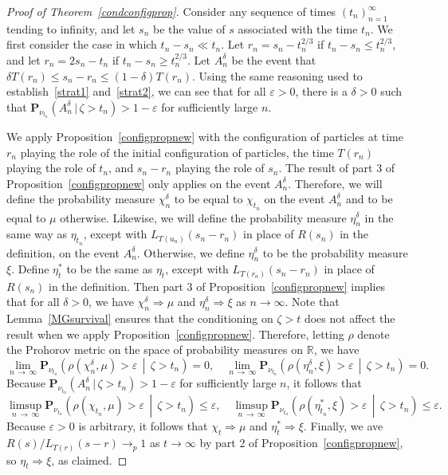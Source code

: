 \documentclass[AHL,Unicode,longabstracts,published]{cedram}
\newcommand*\eps{\varepsilon}
\renewcommand*\P{\mathbf{P}}
\newcommand*\R{\mathbb{R}}
\newcommand{\1} {\mathds{1}}
\begin{document}
\begin{proof}[Proof of Theorem~\ref{condconfigprop}]
Consider any sequence of times $(t_n)_{n=1}^{\infty}$ tending to infinity, and let $s_n$ be the value of $s$ associated with the time $t_n$. We first consider the case in which $t_n - s_n \ll t_n$. Let $r_n = s_n - t_n^{2/3}$ if $t_n - s_n \leq t_n^{2/3}$, and let $r_n = 2s_n - t_n$ if $t_n - s_n \geq t_n^{2/3}$. Let $A_n^{\delta}$ be the event that $\delta T(r_n) \leq s_n - r_n \leq (1 - \delta) T(r_n)$. Using the same reasoning used to establish~\eqref{strat1} and~\eqref{strat2}, we can see that for all $\eps > 0$, there is a $\delta > 0$ such that $\P_{\nu_{t_n}}(A_n^{\delta} \,|\, \zeta > t_n) > 1 - \eps$ for sufficiently large $n$.

We apply Proposition~\ref{configpropnew} with the configuration of particles at time $r_n$ playing the role of the initial configuration of particles, the time $T(r_n)$ playing the role of $t_n$, and $s_n - r_n$ playing the role of $s_n$. The result of part 3 of Proposition~\ref{configpropnew} only applies on the event $A_n^{\delta}$. Therefore, we will define the probability measure $\chi_n^{\delta}$ to be equal to $\chi_{t_n}$ on the event $A_n^{\delta}$ and to be equal to $\mu$ otherwise. Likewise, we will define the probability measure $\eta_n^{\delta}$ in the same way as $\eta_{t_n}$, except with $L_{T(u_n)}(s_n - r_n)$ in place of $R(s_n)$ in the definition, on the event $A_n^{\delta}$. Otherwise, we define $\eta_n^{\delta}$ to be the probability measure $\xi$. Define $\eta_t^*$ to be the same as $\eta_t$, except with $L_{T(r_n)}(s_n - r_n)$ in place of $R(s_n)$ in the definition. Then part 3 of Proposition~\ref{configpropnew} implies that for all $\delta > 0$, we have $\chi_n^{\delta} \Rightarrow \mu$ and $\eta_n^{\delta} \Rightarrow \xi$ as $n \rightarrow \infty$. Note that Lemma~\ref{MGsurvival} ensures that the conditioning on $\zeta > t$ does not affect the result when we apply Proposition~\ref{configpropnew}.
Therefore, letting $\rho$ denote the Prohorov metric on the space of probability measures on $\R$, we have
\[
\lim_{n\,\rightarrow\,\infty} \P_{\nu_{t_n}}\left(\rho\left(\chi_n^{\delta}, \mu\right) > \eps\,\middle|\,\zeta > t_n\right) = 0, \quad\lim_{n\,\rightarrow\,\infty} \P_{\nu_{t_n}}\left(\rho\left(\eta_n^{\delta}, \xi\right) > \eps\,\middle|\,\zeta > t_n\right) = 0.
\]
Because $\P_{\nu_{t_n}}(A_n^{\delta} \,|\, \zeta > t_n) > 1 - \eps$ for sufficiently large $n$, it follows that
\[
\limsup_{n\,\rightarrow\,\infty} \P_{\nu_{t_n}}\left(\rho\left(\chi_{t_n}, \mu\right) > \eps\,\middle|\, \zeta > t_n\right) \leq \eps, \quad\limsup_{n\,\rightarrow\,\infty} \P_{\nu_{t_n}}\left(\rho\left(\eta^*_{t_n}, \xi\right) > \eps\,\middle|\,\zeta > t_n\right) \leq \eps.
\]
Because $\eps > 0$ is arbitrary, it follows that $\chi_t \Rightarrow \mu$ and $\eta_t^* \Rightarrow \xi$. Finally, we ave $R(s)/L_{T(r)}(s - r) \rightarrow_p 1$ as $t \rightarrow \infty$ by part 2 of Proposition~\ref{configpropnew}, so $\eta_t \Rightarrow \xi$, as claimed.


\end{proof}
\end{document}
